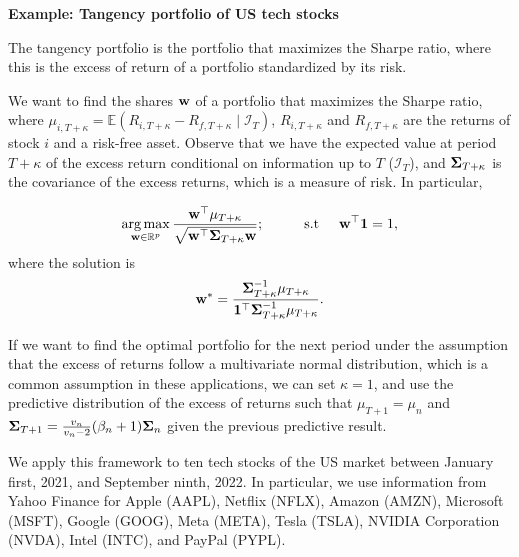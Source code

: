 \begin{enumerate}
\textbf{Example: Tangency portfolio of US tech stocks}

The tangency portfolio is the portfolio that maximizes the Sharpe ratio, where this is the excess of return of a portfolio standardized by its risk. 

We want to find the shares ${\bf w}$ of a portfolio that maximizes the Sharpe ratio, where $\mu_{i,T+\kappa}=\mathbb{E}(R_{i,T+\kappa}-R_{f,T+\kappa}\mid \mathcal{I}_T)$, $R_{i,T+\kappa}$ and $R_{f,T+\kappa}$ are the returns of stock $i$ and a risk-free asset. Observe that we have the expected value at period $T+\kappa$ of the excess return conditional on information up to $T$ ($\mathcal{I}_T$), and ${\bf\Sigma}_{T+\kappa}$ is the covariance of the excess returns, which is a measure of risk. In particular, 

\begin{equation*}
	\operatorname*{arg\,max}_{{\bf w}\in \mathbb{R}^{p}} \frac{{\bf w}^{\top}{\bf \mu}_{T+\kappa}}{\sqrt{{\bf w}^{\top}{\bf\Sigma}_{T+\kappa} {\bf w}}}; \hspace{1cm} \text{s.t}\hspace{.5cm} {\bf w}^{\top}{\bf{1}}=1,
\end{equation*}
where the solution is
\begin{equation*}
	{\bf w}^*=\frac{{\bf\Sigma}^{-1}_{T+\kappa}{\bf \mu}_{T+\kappa}}{{\bf{1}}^{\top}{\bf \Sigma}^{-1}_{T+\kappa}{\bf \mu}_{T+\kappa}}.
\end{equation*}

If we want to find the optimal portfolio for the next period under the assumption that the excess of returns follow a multivariate normal distribution, which is a common assumption in these applications, we can set $\kappa=1$, and use the predictive distribution of the excess of returns such that $\mu_{T+1}=\mu_n$ and ${\bf\Sigma}_{T+1}=\frac{v_n}{v_n-2}(\beta_n+1){\bf{\Sigma}}_n$ given the previous predictive result.

We apply this framework to ten tech stocks of the US market between January first, 2021, and September ninth, 2022. In particular, we use information from Yahoo Finance for Apple (AAPL), Netflix (NFLX), Amazon (AMZN), Microsoft (MSFT), Google (GOOG), Meta (META), Tesla (TSLA), NVIDIA Corporation (NVDA), Intel (INTC), and PayPal (PYPL).


\end{enumerate}
